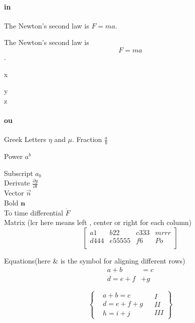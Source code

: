\documentclass[a4paper,11pt]{book} %
\begin{document}
	\paragraph{in} The Newton's second law is $F=ma$. %

	The Newton's second law is \[F=ma\].  %

	x

	y\\
	z

	\paragraph{ou}
	Greek Letters $\eta$ and $\mu$.
	Fraction $\frac{a}{b}$

	Power $a^b$

	Subscript $a_b$\\
	Derivate $\frac{\partial y}{\partial t}$\\
	Vector $\vec{n}$\\
	Bold $\mathbf{n}$\\
	To time differential $\dot{F}$\\
	Matrix (lcr here means left , center or right for each column)
	\[
		\left[
			\begin{array}{llcr}
				a1 & b22 & c333 & mrrr\\
				d444 & e55555 & f6 & Po\\
			\end{array}
		\right]
	\]

	Equations(here \& is the symbol for aligning different rows)
	\begin{align}
		a+b&=c\\
		d=e+f&+g
	\end{align}

	\[
		\left\{ %
			\begin{aligned}
				&a+b=c\\
				&d=e+f+g\\
				&h=i+j
			\end{aligned} %
			\begin{aligned}
				&I \\
				&II\\
				&III
			\end{aligned}
		\right\}%
	\]
	
\end{document}
